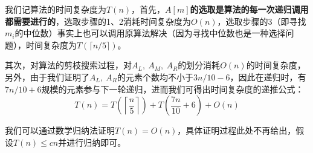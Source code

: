 \documentclass[12pt,a4paper,violet,oneside]{bbe}
\begin{document}
我们记算法的时间复杂度为$T(n)$，首先，\textbf{$A[m]$的选取是算法的每一次递归调用都需要进行的}，选取步骤的1、2消耗时间复杂度为$O(n)$，选取步骤的3（即寻找$m_i$的中位数）事实上也可以调用原算法解决（因为寻找中位数也是一种选择问题），时间复杂度为$T(\lceil n/5\rceil)$。

其次，对算法的剪枝搜索过程，对$A_L,~A_M,~A_R$的划分消耗$O(n)$的时间复杂度，另外，由于我们证明了$A_L,~A_R$的元素个数均不小于$3n/10-6$，因此在递归时，有$7n/10+6$规模的元素参与下一轮递归，进而我们可得出时间复杂度的递推公式：
$$
T(n)=T\left(\left\lceil\frac{n}{5}\right\rceil\right)+T\left(\frac{7n}{10}+6\right)+O(n)
$$

我们可以通过数学归纳法证明$T(n)=O(n)$，具体证明过程此处不再给出，假设$T(n)\leqslant cn$并进行归纳即可。
\end{document}
